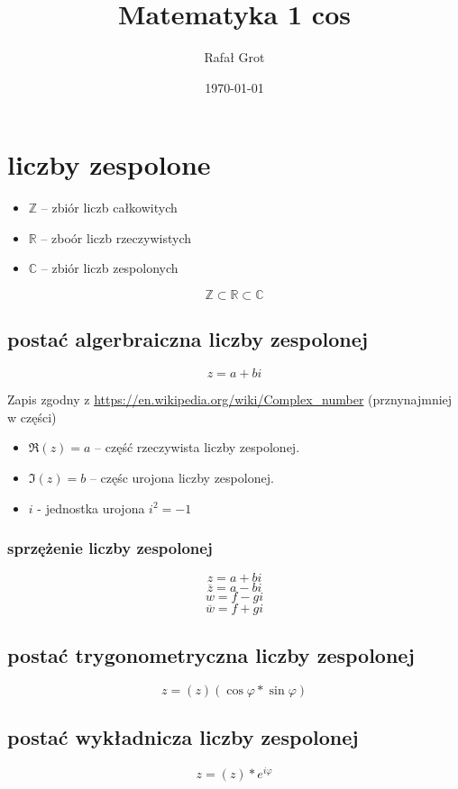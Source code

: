 \documentclass[11pt]{article}
\author{Rafał Grot}
\date{\today}
\title{Matematyka 1 cos}
\begin{document}
\maketitle
\tableofcontents


\section{liczby zespolone}
\label{sec:orge56be65}
\begin{itemize}
\item \(\mathbb{Z}\) -- zbiór liczb całkowitych
\item \(\mathbb{R}\) -- zboór liczb rzeczywistych
\item \(\mathbb{C}\) -- zbiór liczb zespolonych
\end{itemize}
$$\mathbb{Z} \subset \mathbb{R} \subset \mathbb{C}$$
\subsection{postać algerbraiczna liczby zespolonej}
\label{sec:orgcef79a5}
$$z=a+bi$$

Zapis zgodny z \url{https://en.wikipedia.org/wiki/Complex\_number} (prznynajmniej w części)
\begin{itemize}
\item \(\Re(z) = a\) -- część rzeczywista liczby zespolonej.
\item \(\Im(z) = b\) -- częśc urojona liczby zespolonej.
\item \(i\) - jednostka urojona \(i^2=-1\)
\end{itemize}
\subsubsection{sprzężenie liczby zespolonej}
\label{sec:org90479e2}
$$z=a+bi$$
$$\overline{z}=a-bi$$
$$w=f-gi$$
$$\overline{w}=f+gi$$
\subsection{postać trygonometryczna liczby zespolonej}
\label{sec:org10025c2}
$$z=(z)(\cos\varphi*\sin\varphi)$$
\subsection{postać wykładnicza liczby zespolonej}
\label{sec:org908b74d}
$$z=(z)*e^{i\varphi}$$
\end{document}
